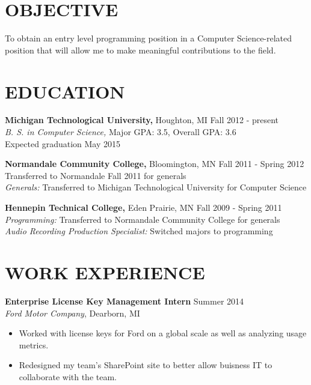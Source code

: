 \documentclass[line,margin]{res}
\begin{document}

\address{17460 Barrington Court, Minnetonka, MN 55345}
\address{(952) 412-5004, milo@milogert.com}


\begin{resume}

\section{OBJECTIVE}

To obtain an entry level programming position in a Computer Science-related position that will allow me to make meaningful contributions to the field.


\section{EDUCATION}

{\bf Michigan Technological University,} Houghton, MI \hfill Fall 2012 - present \\
{\sl B. S. in Computer Science,} Major GPA: 3.5, Overall GPA: 3.6 \\
Expected graduation May 2015

{\bf Normandale Community College,} Bloomington, MN \hfill Fall 2011 - Spring 2012 \\
Transferred to Normandale Fall 2011 for generals \\
{\sl Generals:} Transferred to Michigan Technological University for Computer Science

{\bf Hennepin Technical College,} Eden Prairie, MN \hfill Fall 2009 - Spring 2011 \\
{\sl Programming:} Transferred to Normandale Community College for generals\\
{\sl Audio Recording Production Specialist:} Switched majors to programming


\section{WORK EXPERIENCE}

{\bf Enterprise License Key Management Intern} \hfill Summer 2014 \\
{\sl Ford Motor Company}, Dearborn, MI
\begin{itemize}

  \itemsep -2pt %

  \item Worked with license keys for Ford on a global scale as well as analyzing usage metrics.
  \item Redesigned my team's SharePoint site to better allow buisness IT to collaborate with the team.


\end{itemize}
\end{resume}
\end{document}
